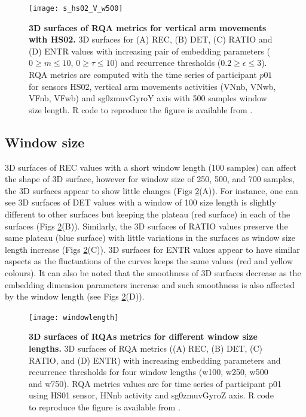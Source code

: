 \begin{figure}[!ht]
\centering
\texttt{[image: s\_hs02\_V\_w500]}
    \caption{
	{\bf 3D surfaces of RQA metrics for vertical arm movements with HS02.}
	3D surfaces for (A) REC, (B) DET, (C) RATIO and (D) ENTR values 
	with increasing pair of embedding parameters 
	($0 \ge m \le 10$, $0 \ge \tau \le 10$) 
	and recurrence thresholds ($ 0.2 \ge \epsilon \le 3 $).
	RQA metrics are computed with the time series of participant $p01$ 
	for sensors HS02, vertical arm movements activities 
	(VNnb, VNwb, VFnb, VFwb) and 
	sg0zmuvGyroY axis with 500 samples window size length. 
        R code to reproduce the figure is available from \cite{hwum2018}.
	}
\label{fig:topo_s_hs02_V_w500}
\end{figure}


\subsection{Window size}
3D surfaces of REC values with a short window length (100 samples) can affect
the shape of 3D surface, however for window size of 250, 500, and 700 samples,
the 3D surfaces appear to show little changes 
(Figs \ref{fig:topo_windows_hii}(A)).
For instance, one can see 3D surfaces of DET values with a window of 100 
size length is slightly different to other surfaces but keeping the plateau
(red surface) in each of the surfaces (Figs \ref{fig:topo_windows_hii}(B)).
Similarly, the 3D surfaces of RATIO values preserve the same plateau 
(blue surface) with little variations in the surfaces as window size length 
increase (Figs \ref{fig:topo_windows_hii}(C)).
3D surfaces for ENTR values appear to have similar aspects as the 
fluctuations of the curves keeps the same values (red and yellow colours).
It can also be noted that the smoothness of 3D surfaces decrease as the 
embedding dimension parameters increase and such smoothness is also affected 
by the window length (see Figs \ref{fig:topo_windows_hii}(D)).


\begin{figure}[!ht]
\centering
\texttt{[image: windowlength]}
    \caption{
	{\bf 3D surfaces of RQAs metrics for different window size lengths.}
	3D surfaces of RQA metrics ((A) REC, (B) DET, (C) RATIO, and (D) ENTR) 
	with increasing embedding 
	parameters and recurrence thresholds for four window 
	lengths (w100, w250, w500 and  w750).
	RQA metrics values are for time series of participant p01 
	using HS01 sensor, HNnb activity and sg0zmuvGyroZ axis.
	R code to reproduce the figure is available from \cite{hwum2018}.
       }
\label{fig:topo_windows_hii}
\end{figure}


